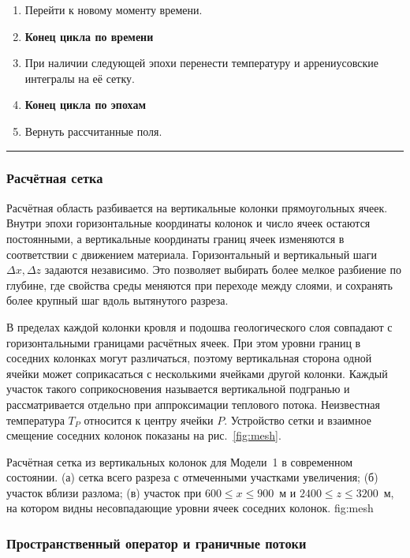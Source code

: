 \begin{minipage}{\linewidth}
\begin{enumerate}
\item \hspace*{2em}Перейти к новому моменту времени.
\item \hspace*{1em}\textbf{Конец цикла по времени}
\item \hspace*{1em}При наличии следующей эпохи перенести температуру и аррениусовские интегралы на её сетку.
\item \textbf{Конец цикла по эпохам}
\item Вернуть рассчитанные поля.
\end{enumerate}
\smallskip
\hrule
\end{minipage}

\subsubsection{Расчётная сетка}
\label{sec:mesh}

Расчётная область разбивается на вертикальные колонки прямоугольных ячеек. Внутри эпохи горизонтальные координаты колонок и число ячеек остаются постоянными, а вертикальные координаты границ ячеек изменяются в соответствии с движением материала. Горизонтальный и вертикальный шаги $\Delta x,\Delta z$ задаются независимо. Это позволяет выбирать более мелкое разбиение по глубине, где свойства среды меняются при переходе между слоями, и сохранять более крупный шаг вдоль вытянутого разреза.

В пределах каждой колонки кровля и подошва геологического слоя совпадают с горизонтальными границами расчётных ячеек. При этом уровни границ в соседних колонках могут различаться, поэтому вертикальная сторона одной ячейки может соприкасаться с несколькими ячейками другой колонки. Каждый участок такого соприкосновения называется вертикальной подгранью и рассматривается отдельно при аппроксимации теплового потока. Неизвестная температура $T_P$ относится к центру ячейки $P$. Устройство сетки и взаимное смещение соседних колонок показаны на рис.~\ref{fig:mesh}.

 {Расчётная сетка из вертикальных колонок для Модели~1 в современном состоянии. (а) сетка всего разреза с отмеченными участками увеличения; (б) участок вблизи разлома; (в) участок при $600\leq x\leq900$~м и $2400\leq z\leq3200$~м, на котором видны несовпадающие уровни ячеек соседних колонок.} {fig:mesh}

\subsubsection{Пространственный оператор и граничные потоки}


